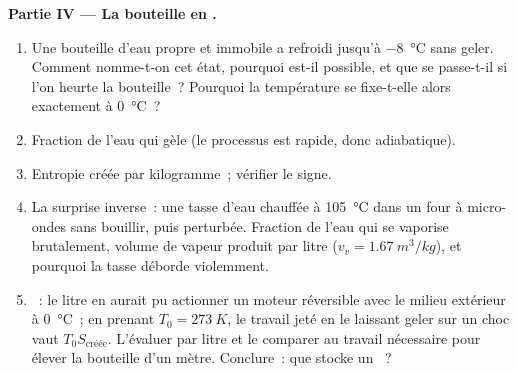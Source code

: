 \begin{problem}
\medskip
\noindent\textbf{Partie IV --- La bouteille en .}
\begin{enumerate}[resume]
  \item Une bouteille d'eau propre et immobile a refroidi jusqu'à
        \qty{-8}{\degreeCelsius} sans geler. Comment nomme-t-on cet état,
        pourquoi est-il possible, et que se passe-t-il si l'on heurte la
        bouteille~? Pourquoi la température se fixe-t-elle alors exactement à
        \qty{0}{\degreeCelsius}~?
  \item Fraction de l'eau qui gèle (le processus est rapide, donc adiabatique).
  \item Entropie créée par kilogramme~; vérifier le signe.
  \item La surprise inverse~: une tasse d'eau chauffée à \qty{105}{\degreeCelsius}
        dans un four à micro-ondes sans bouillir, puis perturbée. Fraction de
        l'eau qui se vaporise brutalement, volume de vapeur produit par litre
        ($v_v = \qty{1.67}{m^3/kg}$), et pourquoi la tasse déborde violemment.
  \item {}~: le litre en  aurait pu actionner un moteur
        réversible avec le milieu extérieur à \qty{0}{\degreeCelsius}~; en
        prenant $T_0 = \qty{273}{K}$, le travail jeté en le laissant geler sur
        un choc vaut $T_0S_{\text{créée}}$. L'évaluer par litre et le comparer
        au travail nécessaire pour élever la bouteille d'un mètre. Conclure~:
        que stocke un ~?
\end{enumerate}
\end{problem}

